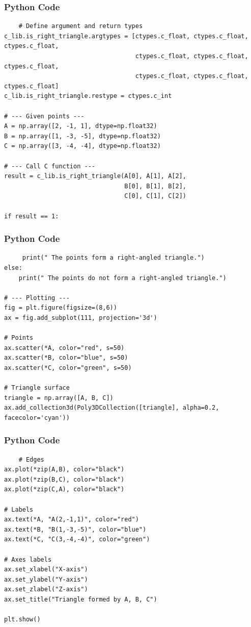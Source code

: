 \documentclass{beamer}
\begin{document}
\begin{frame}[fragile]
    \frametitle{Python Code}
    \begin{lstlisting}
    # Define argument and return types
c_lib.is_right_triangle.argtypes = [ctypes.c_float, ctypes.c_float, ctypes.c_float,
                                    ctypes.c_float, ctypes.c_float, ctypes.c_float,
                                    ctypes.c_float, ctypes.c_float, ctypes.c_float]
c_lib.is_right_triangle.restype = ctypes.c_int

# --- Given points ---
A = np.array([2, -1, 1], dtype=np.float32)
B = np.array([1, -3, -5], dtype=np.float32)
C = np.array([3, -4, -4], dtype=np.float32)

# --- Call C function ---
result = c_lib.is_right_triangle(A[0], A[1], A[2],
                                 B[0], B[1], B[2],
                                 C[0], C[1], C[2])

if result == 1:
    \end{lstlisting}
\end{frame}

\begin{frame}[fragile]
    \frametitle{Python Code}
    \begin{lstlisting}
     print(" The points form a right-angled triangle.")
else:
    print(" The points do not form a right-angled triangle.")

# --- Plotting ---
fig = plt.figure(figsize=(8,6))
ax = fig.add_subplot(111, projection='3d')

# Points
ax.scatter(*A, color="red", s=50)
ax.scatter(*B, color="blue", s=50)
ax.scatter(*C, color="green", s=50)

# Triangle surface
triangle = np.array([A, B, C])
ax.add_collection3d(Poly3DCollection([triangle], alpha=0.2, facecolor='cyan'))
    \end{lstlisting}
\end{frame}

\begin{frame}[fragile]
    \frametitle{Python Code}
    \begin{lstlisting}
    # Edges
ax.plot(*zip(A,B), color="black")
ax.plot(*zip(B,C), color="black")
ax.plot(*zip(C,A), color="black")

# Labels
ax.text(*A, "A(2,-1,1)", color="red")
ax.text(*B, "B(1,-3,-5)", color="blue")
ax.text(*C, "C(3,-4,-4)", color="green")

# Axes labels
ax.set_xlabel("X-axis")
ax.set_ylabel("Y-axis")
ax.set_zlabel("Z-axis")
ax.set_title("Triangle formed by A, B, C")

plt.show()

    \end{lstlisting}
\end{frame}
\end{document}
